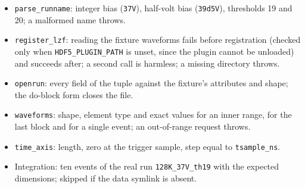 \documentclass[11pt]{article}
\newcommand{\code}[1]{\texttt{#1}}
\begin{document}
\begin{itemize}
\item \code{parse\_runname}: integer bias (\code{37V}), half-volt bias
  (\code{39d5V}), thresholds 19 and 20; a malformed name throws.
\item \code{register\_lzf}: reading the fixture waveforms fails before
  registration (checked only when \code{HDF5\_PLUGIN\_PATH} is unset, since
  the plugin cannot be unloaded) and succeeds after; a second call is harmless;
  a missing directory throws.
\item \code{openrun}: every field of the tuple against the fixture's
  attributes and shape; the do-block form closes the file.
\item \code{waveforms}: shape, element type and exact values for an inner
  range, for the last block and for a single event; an out-of-range request
  throws.
\item \code{time\_axis}: length, zero at the trigger sample, step equal to
  \code{tsample\_ns}.
\item Integration: ten events of the real run \code{128K\_37V\_th19} with the
  expected dimensions; skipped if the data symlink is absent.
\end{itemize}
\end{document}
